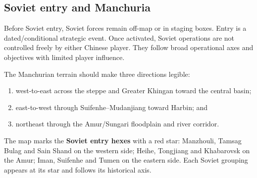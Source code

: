 \documentclass[11pt]{article}
\begin{document}
\subsection{Soviet entry and Manchuria}
Before Soviet entry, Soviet forces remain off-map or in staging boxes. Entry is a dated/conditional strategic event. Once activated, Soviet operations are not controlled freely by either Chinese player. They follow broad operational axes and objectives with limited player influence.

The Manchurian terrain should make three directions legible:
\begin{enumerate}
\item west-to-east across the steppe and Greater Khingan toward the central basin;
\item east-to-west through Suifenhe--Mudanjiang toward Harbin; and
\item northeast through the Amur/Sungari floodplain and river corridor.
\end{enumerate}

The map marks the \textbf{Soviet entry hexes} with a red star: Manzhouli, Tamsag Bulag and Sain Shand on the western side; Heihe, Tongjiang and Khabarovsk on the Amur; Iman, Suifenhe and Tumen on the eastern side. Each Soviet grouping appears at its star and follows its historical axis.
\end{document}
